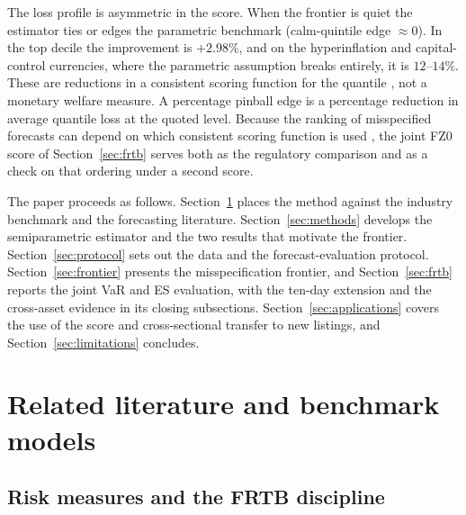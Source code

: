 \documentclass[11pt]{article}
\theoremstyle{remark}
\begin{document}
The loss profile is asymmetric in the score. When the frontier is quiet the estimator ties or edges the parametric benchmark (calm-quintile edge $\approx 0$). In the top decile the improvement is $+2.98\%$, and on the hyperinflation and capital-control currencies, where the parametric assumption breaks entirely, it is $12$--$14\%$. These are reductions in a
consistent scoring function for the quantile \citep{gneiting2011}, not
a monetary welfare measure. A percentage pinball edge is a percentage
reduction in average quantile loss at the quoted level. Because the
ranking of misspecified forecasts can depend on which consistent
scoring function is used \citep{patton2020}, the joint FZ0 score of
Section~\ref{sec:frtb} serves both as the regulatory comparison and as
a check on that ordering under a second score.

\medskip\noindent The paper proceeds as follows.
Section~\ref{sec:background} places the method against the industry benchmark and the forecasting literature. Section~\ref{sec:methods} develops the semiparametric estimator and the two results that motivate the frontier. Section~\ref{sec:protocol} sets out the data and the forecast-evaluation protocol. Section~\ref{sec:frontier} presents the misspecification frontier, and Section~\ref{sec:frtb} reports the joint VaR and ES evaluation, with the ten-day extension and the cross-asset evidence in its closing subsections. Section~\ref{sec:applications} covers the use of the score and cross-sectional transfer to new listings, and Section~\ref{sec:limitations} concludes.

\section{Related literature and benchmark models}\label{sec:background}

\subsection{Risk measures and the FRTB discipline}
\end{document}

